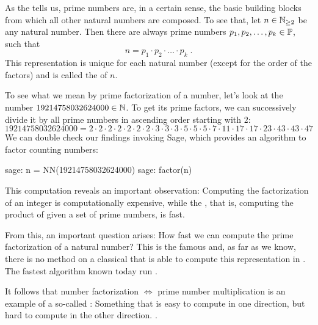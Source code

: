 As the  tells us, prime numbers are, in a certain sense, the basic building blocks from which all other natural numbers are composed. To see that, let $ n \in \mathbb{N}_{\geq 2} $ be any natural number. Then there are always prime numbers $ p_1, p_2, \ldots, p_k \in \mathbb{P} $, such that
\begin{equation}
n = p_1 \cdot p_2 \cdot \ldots \cdot p_k \;.
\end{equation}
This representation is unique for each natural number (except for the order of the factors) and is called the  of $n$.
\begin{example}\label{ex-prime-factorization} To see what we mean by prime factorization of a number, let's look at the number $19214758032624000\in\mathbb{N}$. To get its prime factors, we can successively divide it by all prime numbers in ascending order starting with $2$:
\begin{equation*}
19214758032624000 = 2\cdot 2\cdot 2\cdot 2\cdot 2\cdot 2\cdot 2 \cdot 3\cdot 3\cdot 3\cdot 5\cdot 5\cdot 5\cdot 7 \cdot 11 \cdot 17\cdot 17 \cdot 23 \cdot 43\cdot 43 \cdot 47
\end{equation*}
We can double check our findings invoking Sage, which provides an algorithm to factor counting numbers:
\begin{sagecommandline}
sage: n = NN(19214758032624000)
sage: factor(n)
\end{sagecommandline}
\end{example}
This computation reveals an important observation: Computing the factorization of an integer is computationally expensive, while the , that is, computing the product of given a set of prime numbers, is fast. 

From this, an important question arises: How fast we can compute the prime factorization of a natural number? This is the famous  and, as far as we know, there is no method on a classical  that is able to compute this representation in . The fastest algorithm known today run .

It follows that number factorization $\Leftrightarrow$ prime number multiplication is an example of a so-called  : Something that is easy to compute in one direction, but hard to compute in the other direction. .


